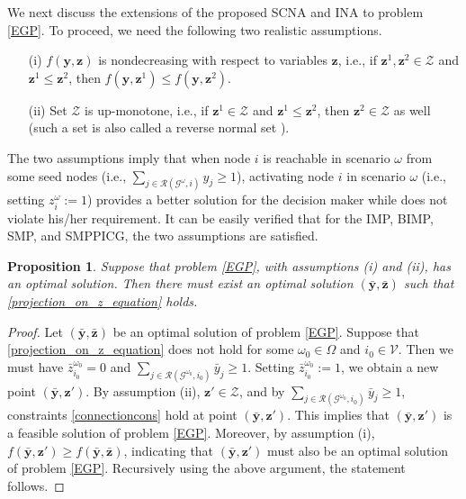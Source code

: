 \documentclass[a4paper,10pt]{article}
\newcommand{\G}{\mathcal{G}}
\newcommand{\V}{\mathcal{V}}
\newcommand{\R}{\mathcal{R}}
\theoremstyle{plain}
\newcommand{\bz}{{\boldsymbol{z}}}
\newtheorem{proposition}[theorem]{Proposition}
\newcommand{\revv}[1]{{#1}}
\begin{document}
	We next discuss \revv{the extensions of the proposed SCNA and INA  to problem \eqref{EGP}}.
	To proceed, we need the following two realistic assumptions.
	\begin{itemize}
		\item [(i)] $f(\boldsymbol{y},\boldsymbol{z})$ is nondecreasing with respect to variables $\boldsymbol{z}$, i.e.,  if $\bz^1,\bz^2 \in \mathcal{Z}$ and $\bz^1 \leq \bz^2 $, then $f(\boldsymbol{y},\boldsymbol{z}^1) \leq f(\boldsymbol{y},\boldsymbol{z}^2)$.
		\item [(ii)] Set $\mathcal{Z}$ is up-monotone, i.e., if $\bz^1 \in \mathcal{Z}$ and $\bz^1 \leq \bz^2 $, then ${\bz}^2 \in \mathcal{Z}$ as well (such a set is also called a reverse normal set \cite{Tuy2000}).
	\end{itemize}
	The two assumptions imply that when node $i$ is reachable in scenario $\omega$ from some seed nodes
	(i.e., $\sum_{j\in\R(\G^{\omega},i)}y_j\geq 1$), 
	activating node $i$ in scenario $\omega$ (i.e., setting $z_i^{\omega}:=1$)
	provides a better solution for  the decision maker while does not violate his/her requirement.
	It can be easily verified that for the IMP, BIMP, SMP, and SMPPICG, the two assumptions are satisfied.
	\begin{proposition}\label{theorem: EPG}
		Suppose that problem \eqref{EGP}, with assumptions (i) and (ii), has an optimal solution.
		Then there must exist an optimal solution $(\bar{\boldsymbol{y}},\bar{\boldsymbol{z}})$ such that  \eqref{projection_on_z_equation} holds.
	\end{proposition}
	\begin{proof}
		Let $(\bar{\boldsymbol{y}},\bar{\boldsymbol{z}})$ be an optimal solution of problem \eqref{EGP}.
		Suppose that  \eqref{projection_on_z_equation} does not hold for some $\omega_0\in\Omega$ and $i_0\in\V$.
		Then we must have  $\bar{z}^{\omega_0}_{i_0}=0$ and $\sum_{j\in\R(\G^{\omega_0},i_0)}\bar{y}_j\geq 1$.
		Setting  $\bar{z}^{\omega_0}_{i_0}:=1$, we obtain a new point  $(\bar{\boldsymbol{y}}, {\boldsymbol{z}'})$.
		By assumption (ii), ${\boldsymbol{z}'} \in \mathcal{Z}$, and by $\sum_{j\in\R(\G^{\omega_0},i_0)}\bar{y}_j\geq 1$,  constraints \eqref{connectioncons} hold at point $(\boldsymbol{\bar{y}}, {\boldsymbol{z}'})$.
		This implies that  $(\bar{\boldsymbol{y}}, {\boldsymbol{z}'})$ is  a  feasible solution of problem \eqref{EGP}.
		Moreover, by assumption (i), $f(\bar{\boldsymbol{y}}, {\boldsymbol{z}'}) \geq f(\bar{\boldsymbol{y}},\bar{\boldsymbol{z}})$, indicating that $(\bar{\boldsymbol{y}}, {\boldsymbol{z}'})$ must also be an optimal solution of problem \eqref{EGP}.
		Recursively using the above argument, the statement follows.
	\end{proof}
	
\end{document}
